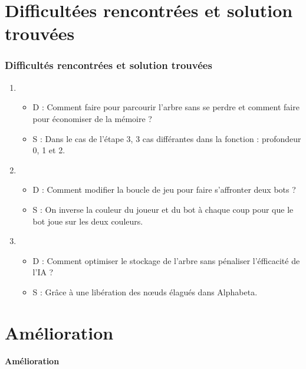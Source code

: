 \documentclass[9pt]{beamer}
\begin{document}
\section{Difficultées rencontrées et solution trouvées}
\begin{frame}
  \frametitle{Difficultés rencontrées et solution trouvées}
  \begin{enumerate}
    \item
    \begin{itemize}
      \item D : Comment faire pour parcourir l'arbre sans se perdre et comment faire pour économiser de la mémoire ?
      \item S : Dans le cas de l'étape 3, 3 cas différantes dans la fonction : profondeur 0, 1 et 2.   
    \end{itemize}
    \item
    \begin{itemize}
      \item D : Comment modifier la boucle de jeu pour faire s'affronter deux bots ?
      \item S : On inverse la couleur du joueur et du bot à chaque coup pour que le bot joue sur les deux couleurs.
    \end{itemize}
    \item
    \begin{itemize}
      \item D : Comment optimiser le stockage de l'arbre sans pénaliser l'éfficacité de l'IA ?
      \item S : Grâce à une libération des nœuds élagués dans Alphabeta.
    \end{itemize}
  \end{enumerate}
\end{frame}

\section{Amélioration}
\begin{frame}
  \begin{center}
      \Large \textbf{Amélioration}
  \end{center}
\end{frame}
\end{document}
